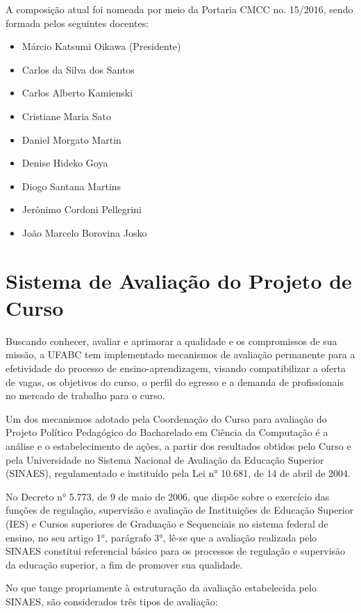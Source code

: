 \documentclass{article}
\begin{document}
A composição atual foi nomeada por meio da Portaria CMCC no. 15/2016, sendo formada 
pelos seguintes docentes:

\begin{itemize}
\item Márcio Katsumi Oikawa (Presidente)
\item Carlos da Silva dos Santos
\item Carlos Alberto Kamienski
\item Cristiane Maria Sato
\item Daniel Morgato Martin
\item Denise Hideko Goya
\item Diogo Santana Martins
\item Jerônimo Cordoni Pellegrini
\item João Marcelo Borovina Josko
\end{itemize}

\newpage
\section {Sistema de Avaliação do Projeto de Curso}

Buscando conhecer, avaliar e aprimorar a qualidade e os compromissos de sua missão, a
UFABC tem implementado mecanismos de avaliação permanente para a efetividade do processo de ensino-aprendizagem, visando compatibilizar a oferta de vagas, os objetivos do curso, o perfil do egresso e a demanda de profissionais no mercado de trabalho para o curso.

Um dos mecanismos adotado pela Coordenação do Curso para avaliação do Projeto
Político Pedagógico do Bacharelado em Ciência da Computação é a análise e o
estabelecimento de ações, a partir dos resultados obtidos pelo Curso e pela Universidade no
Sistema Nacional de Avaliação da Educação Superior (SINAES), regulamentado e instituído
pela Lei n° 10.681, de 14 de abril de 2004.

No Decreto n° 5.773, de 9 de maio de 2006, que dispõe sobre o exercício das funções de
regulação, supervisão e avaliação de Instituições de Educação Superior (IES) e Cursos
superiores de Graduação e Sequenciais no sistema federal de ensino, no seu artigo 1°,
parágrafo 3°, lê-se que a avaliação realizada pelo SINAES constitui referencial básico para os
processos de regulação e supervisão da educação superior, a fim de promover sua qualidade.

No que tange propriamente à estruturação da avaliação estabelecida pelo SINAES, são
considerados três tipos de avaliação:
\end{document}
